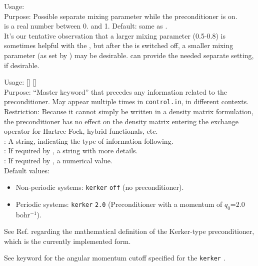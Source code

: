{
  \noindent
  Usage:   \\[1.0ex]
  Purpose: Possible separate mixing parameter while the preconditioner
  is on. \\[1.0ex]
   is a real number between 0. and 1. Default: same as
  . \\
}
It's our tentative observation that a larger mixing parameter (0.5-0.8)
is sometimes helpful with the , but after the
 is switched off, a smaller mixing parameter
(as set by ) may be
desirable.  can provide the needed separate
setting, if desirable.

{
  \noindent
  Usage:   []
    [] \\[1.0ex]
  Purpose: ``Master keyword'' that precedes any information related to
    the preconditioner. May appear multiple times in
    \texttt{control.in}, in different contexts. \\[1.0ex]
  Restriction: Because it cannot simply be written in a density matrix
    formulation, the preconditioner has no effect on the density matrix
    entering the exchange operator for Hartree-Fock, hybrid
    functionals, etc. \\[1.0ex]
   : A string, indicating the type of information
    following. \\
   : If required by , a string with more
    details. \\
   : If required by , a numerical value. \\
}
Default values:
\begin{itemize}
  \item Non-periodic systems:  \texttt{kerker}
    \texttt{off} (no preconditioner).
  \item Periodic systems:  \texttt{kerker}
    \texttt{2.0} (Preconditioner with a momentum of $q_0$=2.0
     bohr$^{-1}$).
\end{itemize}
See Ref. \cite{Blum08} regarding the mathematical
definition of the Kerker-type \cite{Manninen75,Nieminen77,Kerker81}
preconditioner, which is the currently implemented form.

See keyword  for the angular momentum
cutoff specified for the \texttt{kerker} .

